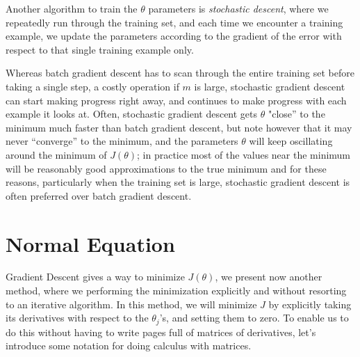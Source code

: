Another algorithm to train the $\theta$ parameters is \emph{stochastic descent}, where 
we repeatedly run through the training set, and each time we encounter a training example,
we update the parameters according to the gradient of the error with respect to that single training example only.

Whereas batch gradient descent has to scan through the entire training set before taking a single step,
a costly operation if $m$ is large, stochastic gradient descent can start making progress right away,
and continues to make progress with each example it looks at.\newline
Often, stochastic gradient descent gets $\theta$ "close” to the minimum much faster than batch 
gradient descent, but note however that it may never “converge” to the minimum, and the parameters
$\theta$ will keep oscillating around the minimum of $J(\theta)$; in practice most of the values near the minimum
will be reasonably good approximations to the true minimum and for these reasons, particularly when 
the training set is large, stochastic gradient descent is often preferred over batch gradient descent.

\section{Normal Equation}
Gradient Descent gives a way to minimize $J(\theta)$, we present now another method, where 
we performing the minimization explicitly and without resorting to an iterative algorithm.\newline
In this method, we will minimize $J$ by explicitly taking its derivatives with respect to the $\theta_j$’s,
and setting them to zero.\newline
To enable us to do this without having to write pages full of matrices of derivatives,
let’s introduce some notation for doing calculus with matrices.

